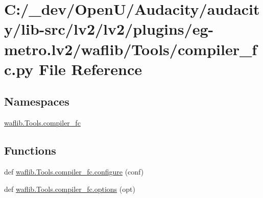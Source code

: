 \hypertarget{lv2_2plugins_2eg-metro_8lv2_2waflib_2_tools_2compiler__fc_8py}{}\section{C\+:/\+\_\+dev/\+Open\+U/\+Audacity/audacity/lib-\/src/lv2/lv2/plugins/eg-\/metro.lv2/waflib/\+Tools/compiler\+\_\+fc.py File Reference}
\label{lv2_2plugins_2eg-metro_8lv2_2waflib_2_tools_2compiler__fc_8py}
\subsection*{Namespaces}
\begin{DoxyCompactItemize}
\item 
 \hyperlink{namespacewaflib_1_1_tools_1_1compiler__fc}{waflib.\+Tools.\+compiler\+\_\+fc}
\end{DoxyCompactItemize}
\subsection*{Functions}
\begin{DoxyCompactItemize}
\item 
def \hyperlink{namespacewaflib_1_1_tools_1_1compiler__fc_afb0080302700edcb49f41f58f40aed12}{waflib.\+Tools.\+compiler\+\_\+fc.\+configure} (conf)
\item 
def \hyperlink{namespacewaflib_1_1_tools_1_1compiler__fc_ad760dedba1ba7a9aa7cfd119667484cd}{waflib.\+Tools.\+compiler\+\_\+fc.\+options} (opt)
\end{DoxyCompactItemize}
